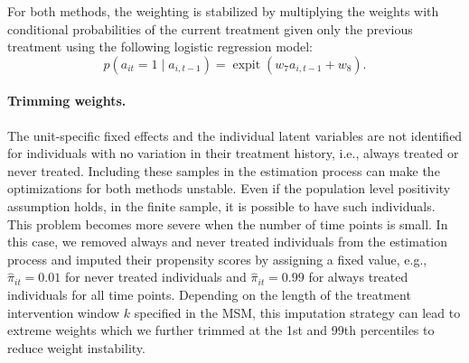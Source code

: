For both methods, the weighting is stabilized by multiplying the weights with 
conditional probabilities of the current treatment given only the previous treatment using 
the following logistic regression model:
\begin{equation}
\label{eq:ps_model_stabilized}
p(a_{it} = 1 \mid a_{i,t-1}) = \operatorname{expit}\!\left(w_7 a_{i,t-1} + w_8\right).
\end{equation}


\paragraph{Trimming weights.} The unit-specific fixed effects and the individual 
latent variables are not identified 
for individuals with no variation in their treatment history, i.e., always 
treated or never treated. Including these samples in the estimation process can make 
the optimizations 
for both methods unstable. Even if the population level positivity assumption holds, 
in the finite sample, it is 
possible to have such individuals. This problem becomes more severe when the 
number of time points is small. 
In this case, we removed always and never treated 
individuals from the estimation process and imputed their propensity 
scores by assigning a fixed value, e.g., $\hat{\pi}_{it} = 0.01$ for never treated 
individuals and $\hat{\pi}_{it} = 0.99$ for always treated individuals for all time points. Depending on the length of the treatment intervention window $k$ specified 
in the MSM, this imputation strategy can lead to extreme weights which 
we further trimmed at the 1st and 99th percentiles to reduce weight instability.

